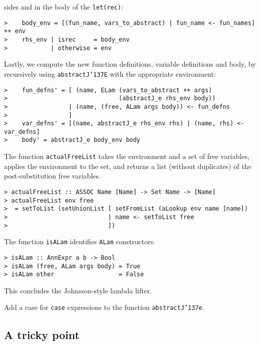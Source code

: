 sides and in the body of the \mbox{\tt let(rec)}:
\begin{verbatim}
>    body_env = [(fun_name, vars_to_abstract) | fun_name <- fun_names] ++ env
>    rhs_env | isrec     = body_env
>            | otherwise = env
\end{verbatim}
Lastly, we compute the new function definitions, variable definitions
and body, by recursively using \mbox{\tt abstractJ{\char'137}E} with the appropriate
environment:
\begin{verbatim}
>    fun_defns' = [ (name, ELam (vars_to_abstract ++ args)
>                               (abstractJ_e rhs_env body))
>                 | (name, (free, ALam args body)) <- fun_defns
>                 ]
>    var_defns' = [(name, abstractJ_e rhs_env rhs) | (name, rhs) <- var_defns]
>    body' = abstractJ_e body_env body
\end{verbatim}
\par
The function \mbox{\tt actualFreeList} takes the environment and a set of free
variables, applies the environment to the set, and returns a list
(without duplicates) of the post-substitution free variables.
\begin{verbatim}
> actualFreeList :: ASSOC Name [Name] -> Set Name -> [Name]
> actualFreeList env free
>  = setToList (setUnionList [ setFromList (aLookup env name [name])
>                            | name <- setToList free
>                            ])
\end{verbatim}
%
%
The function \mbox{\tt isALam} identifies \mbox{\tt ALam} constructors.
\begin{verbatim}
> isALam :: AnnExpr a b -> Bool
> isALam (free, ALam args body) = True
> isALam other                  = False
\end{verbatim}
%
%
%
This concludes the Johnsson-style lambda lifter.

\begin{exercise}
Add a case for \mbox{\tt case} expressions to the function \mbox{\tt abstractJ{\char'137}e}.
\end{exercise}

\subsection{A tricky point\advanced}

